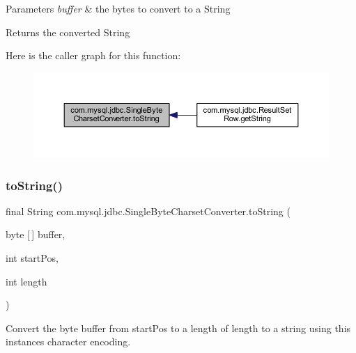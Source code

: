 \begin{DoxyParams}{Parameters}
{\em buffer} & the bytes to convert to a String \\
\hline
\end{DoxyParams}
\begin{DoxyReturn}{Returns}
the converted String 
\end{DoxyReturn}
Here is the caller graph for this function\+:
\nopagebreak
\begin{figure}[H]
\begin{center}
\leavevmode
\includegraphics[width=350pt]{classcom_1_1mysql_1_1jdbc_1_1_single_byte_charset_converter_a4ff777805c18fb811faf1310a02f9814_icgraph}
\end{center}
\end{figure}
\mbox{\label{classcom_1_1mysql_1_1jdbc_1_1_single_byte_charset_converter_ac1f5f932c49579ae691341e20ffac33b}} 
\subsubsection{\texorpdfstring{to\+String()}{toString()}\hspace{0.1cm}{\footnotesize\ttfamily [2/2]}}
{\footnotesize\ttfamily final String com.\+mysql.\+jdbc.\+Single\+Byte\+Charset\+Converter.\+to\+String (\begin{DoxyParamCaption}\item[{byte \mbox{[}$\,$\mbox{]}}]{buffer,  }\item[{int}]{start\+Pos,  }\item[{int}]{length }\end{DoxyParamCaption})}

Convert the byte buffer from start\+Pos to a length of length to a string using this instance\textquotesingle{}s character encoding.


